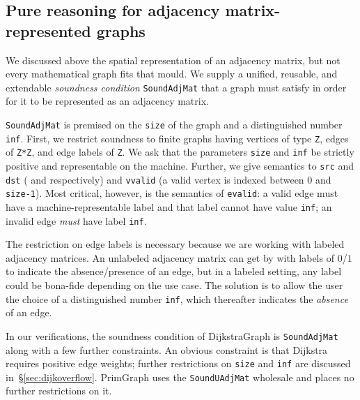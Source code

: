 
\subsection{Pure reasoning for adjacency matrix-represented graphs}

We discussed above the spatial representation of an adjacency 
matrix, but not every mathematical graph fits that mould.
We supply a unified, reusable, and extendable \emph{soundness condition} 
\texttt{SoundAdjMat} that a graph must satisfy in order for it 
to be represented as an adjacency matrix.

\texttt{SoundAdjMat} is premised on the \texttt{size} of the graph
and a distinguished number \texttt{inf}.
First, we restrict soundness to finite graphs having 
vertices of type \texttt{Z}, edges of \texttt{Z*Z}, and 
edge labels of \texttt{Z}. 
We ask that the parameters \texttt{size} and \texttt{inf} be
strictly positive and representable on the machine. 
Further, we give semantics to \texttt{src} and \texttt{dst} 
( and  respectively)
and \texttt{vvalid} (a valid vertex is indexed between $0$ and \texttt{size-1}).
Most critical, however, is the semantics of \texttt{evalid}:
a valid edge must have a machine-representable label and that label
cannot have value \texttt{inf}; an invalid edge \emph{must} have label \texttt{inf}.

The restriction on edge labels is necessary because we are working 
with labeled adjacency matrices. An unlabeled 
adjacency matrix can get by with labels of $0$/$1$ to 
indicate the absence/presence of an edge, but in a labeled 
setting, any label could be bona-fide depending on the use case. 
The solution is to 
allow the user the choice of a distinguished number \texttt{inf},
which thereafter indicates the \emph{absence} of an edge.


In our verifications, 
the soundness condition of DijkstraGraph is \texttt{SoundAdjMat}
along with a few further constraints. An obvious constraint is that Dijkstra 
requires positive edge weights; further restrictions on 
\texttt{size} and \texttt{inf} are discussed in~\S\ref{sec:dijkoverflow}.
PrimGraph uses the \texttt{SoundUAdjMat} wholesale and places no further restrictions
on it.


